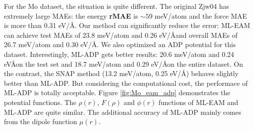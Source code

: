\documentclass[final,3p,times]{elsarticle}
\begin{document}
For the Mo dataset, the situation is quite different. The original Zjw04 has 
extremely large MAEs: the energy \textbf{rMAE} is $\sim 59$ meV/atom and the 
force MAE is more than 0.31 eV/\AA. Our method can significantly reduce the 
error: ML-EAM can achieve test MAEs of 23.8 meV/atom and 0.26 eV/\AA and overall
MAEs of 26.7 meV/atom and 0.30 eV/\AA. We also optimized an ADP potential for 
this dataset. Interestingly, ML-ADP gets better results: 20.6 meV/atom and 
0.24 eV\AA on the test set and 18.7 meV/atom and 0.29 eV/\AA on the entire 
dataset. On the contrast, the SNAP method (13.2 meV/atom, 0.25 eV/\AA) behaves 
slightly better than ML-ADP. But considering the computational cost, the 
performace of ML-ADP is totally acceptable. Figure \ref{fig:Mo_eam_adp} 
demonstrates the potential functions. The $\rho(r)$, $F(\rho)$ and $\phi(r)$ 
functions of ML-EAM and ML-ADP are quite similar. The additional accuracy of 
ML-ADP mainly comes from the dipole function $\mu(r)$. 
\end{document}
